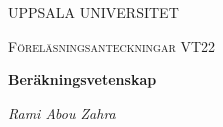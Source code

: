 \begin{titlepage}

  \centering
	{\scshape\LARGE UPPSALA UNIVERSITET\par}
	\vspace{1cm}
  {\scshape\Large {Föreläsningsanteckningar VT22} \par}
	\vspace{1.5cm}
  {\huge\bfseries {Beräkningsvetenskap } \par}
	\vspace{2cm}
	{\Large\itshape Rami Abou Zahra \par}
	\vfill
  \vfill


\end{titlepage}
